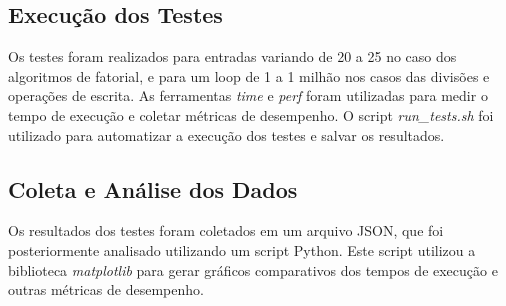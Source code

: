 \documentclass[12pt]{article}
\begin{document}
\subsection{Execução dos Testes}
Os testes foram realizados para entradas variando de 20 a 25 no caso dos algoritmos de fatorial, e para um loop de 1 a 1 milhão nos casos das divisões e operações de escrita. As ferramentas \textit{time} e \textit{perf} foram utilizadas para medir o tempo de execução e coletar métricas de desempenho. O script \textit{run\_tests.sh} foi utilizado para automatizar a execução dos testes e salvar os resultados.

\subsection{Coleta e Análise dos Dados}
Os resultados dos testes foram coletados em um arquivo JSON, que foi posteriormente analisado utilizando um script Python. Este script utilizou a biblioteca \textit{matplotlib} para gerar gráficos comparativos dos tempos de execução e outras métricas de desempenho.
\newpage
\end{document}
